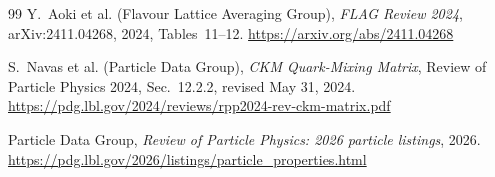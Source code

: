 \documentclass[11pt]{article}
\begin{document}
\begin{thebibliography}{99}
Y.~Aoki et al. (Flavour Lattice Averaging Group),
\emph{FLAG Review 2024},
arXiv:2411.04268, 2024,
Tables~11--12.
\url{https://arxiv.org/abs/2411.04268}

S.~Navas et al. (Particle Data Group),
\emph{CKM Quark-Mixing Matrix},
Review of Particle Physics 2024, Sec.~12.2.2, revised May 31, 2024.
\url{https://pdg.lbl.gov/2024/reviews/rpp2024-rev-ckm-matrix.pdf}

Particle Data Group,
\emph{Review of Particle Physics: 2026 particle listings},
2026.
\url{https://pdg.lbl.gov/2026/listings/particle_properties.html}


\end{thebibliography}
\end{document}
